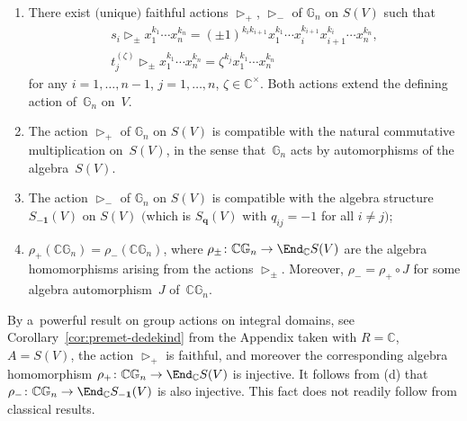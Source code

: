 \begin{Proposition}\label{prop:automorphism}\quad
\begin{enumerate}\itemsep=0pt
\item[$(a)$] There exist $($unique$)$ faithful actions $\mathop{\triangleright}\nolimits_+$, $\mathop{\triangleright}\nolimits_-$ of
$\mathbb G_n$ on $S(V)$ such that
\begin{gather*}
s_i \mathop{\triangleright}\nolimits_\pm x_1^{k_1}\cdots x_n^{k_n} = (\pm 1)^{k_ik_{i+1}} x_1^{k_1}\cdots
x_i^{k_{i+1}}x_{i+1}^{k_i}\cdots x_n^{k_n},
\\
t_j^{(\zeta)}\mathop{\triangleright}\nolimits_\pm x_1^{k_1}\cdots x_n^{k_n} = \zeta^{k_j} x_1^{k_1}\cdots
x_n^{k_n}
\end{gather*}
for any $i=1,\ldots,n-1$, $j=1,\ldots,n$, $\zeta\in \mathbb C^\times$.
Both actions extend the defining action of~$\mathbb G_n$ on~$V$.

\item[$(b)$] The action $\mathop{\triangleright}\nolimits_+$ of $\mathbb G_n$ on $S(V)$ is compatible with the natural
commutative multiplication on~$S(V)$, in the sense that~$\mathbb G_n$ acts by automorphisms of the algebra~$S(V)$.

\item[$(c)$] The action $\mathop{\triangleright}\nolimits_-$ of $\mathbb G_n$ on $S(V)$ is compatible    with the
algebra structure $S_{\mathbf{-1}}(V)$ on $S(V)$ $($which is $S_{\mathbf q}(V)$ with $q_{ij}=-1$ for all $i\ne j)$;

\item[$(d)$] $\rho_+(\mathbb C \mathbb G_n)= \rho_-(\mathbb C \mathbb G_n)$, where $\rho_\pm\colon \mathbb C\mathbb G_n \to
\End_\mathbb C S(V)$ are the algebra homomorphisms arising from the actions $\mathop{\triangleright}\nolimits_\pm$.
Moreover, $\rho_-=\rho_+ \circ J$ for some algebra automorphism~$J$ of~$\mathbb C \mathbb G_n$.
\end{enumerate}
\end{Proposition}

\begin{Remark}
\label{rem:injectivity}
By a~powerful result on group actions on integral domains, see Corollary~\ref{cor:premet-dedekind} from the
Appendix taken with $R=\mathbb C$, $A=S(V)$, the action $\mathop{\triangleright}\nolimits_+$ is faithful, and
moreover the corresponding algebra homomorphism $\rho_+\colon \mathbb C \mathbb G_n \to \End_\mathbb C S(V)$ is
injective.
It follows from (d) that $\rho_-\colon \mathbb C \mathbb G_n\to \End_\mathbb C S_{\mathbf{-1}}(V)$ is also injective.
This fact does not readily follow from classical results.
\end{Remark}



